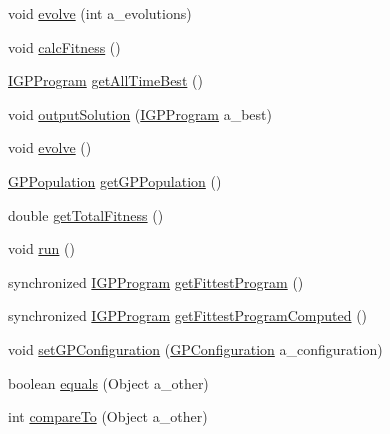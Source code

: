 \begin{DoxyCompactItemize}
\item 
void \hyperlink{classorg_1_1jgap_1_1gp_1_1impl_1_1_g_p_genotype_a43707d524245f50c92094e9e97568089}{evolve} (int a\-\_\-evolutions)
\item 
void \hyperlink{classorg_1_1jgap_1_1gp_1_1impl_1_1_g_p_genotype_aa465c7cbfb45d77644b3d195782a12c9}{calc\-Fitness} ()
\item 
\hyperlink{interfaceorg_1_1jgap_1_1gp_1_1_i_g_p_program}{I\-G\-P\-Program} \hyperlink{classorg_1_1jgap_1_1gp_1_1impl_1_1_g_p_genotype_afb8e0283f47eb7c0a0b6e09c8aeccc96}{get\-All\-Time\-Best} ()
\item 
void \hyperlink{classorg_1_1jgap_1_1gp_1_1impl_1_1_g_p_genotype_abeef3282114d1313c97045dea004afc4}{output\-Solution} (\hyperlink{interfaceorg_1_1jgap_1_1gp_1_1_i_g_p_program}{I\-G\-P\-Program} a\-\_\-best)
\item 
void \hyperlink{classorg_1_1jgap_1_1gp_1_1impl_1_1_g_p_genotype_ad495c700786596290a63e3d88a902766}{evolve} ()
\item 
\hyperlink{classorg_1_1jgap_1_1gp_1_1impl_1_1_g_p_population}{G\-P\-Population} \hyperlink{classorg_1_1jgap_1_1gp_1_1impl_1_1_g_p_genotype_a9a2316294bf28b413eb8b0e288cd150d}{get\-G\-P\-Population} ()
\item 
double \hyperlink{classorg_1_1jgap_1_1gp_1_1impl_1_1_g_p_genotype_a631996e8862da78bdb67b76687ad1873}{get\-Total\-Fitness} ()
\item 
void \hyperlink{classorg_1_1jgap_1_1gp_1_1impl_1_1_g_p_genotype_a184964a4fc96748de13cad57bee24ad0}{run} ()
\item 
synchronized \hyperlink{interfaceorg_1_1jgap_1_1gp_1_1_i_g_p_program}{I\-G\-P\-Program} \hyperlink{classorg_1_1jgap_1_1gp_1_1impl_1_1_g_p_genotype_a2cff99f216e87c7e4b25c217c5bdc5af}{get\-Fittest\-Program} ()
\item 
synchronized \hyperlink{interfaceorg_1_1jgap_1_1gp_1_1_i_g_p_program}{I\-G\-P\-Program} \hyperlink{classorg_1_1jgap_1_1gp_1_1impl_1_1_g_p_genotype_a3a1e955f3a6c035913e311570591c683}{get\-Fittest\-Program\-Computed} ()
\item 
void \hyperlink{classorg_1_1jgap_1_1gp_1_1impl_1_1_g_p_genotype_a2d46992095125ecad698dc9e1a72b513}{set\-G\-P\-Configuration} (\hyperlink{classorg_1_1jgap_1_1gp_1_1impl_1_1_g_p_configuration}{G\-P\-Configuration} a\-\_\-configuration)
\item 
boolean \hyperlink{classorg_1_1jgap_1_1gp_1_1impl_1_1_g_p_genotype_a847cbf8f0b5e3e223881ac1dfe5e36d3}{equals} (Object a\-\_\-other)
\item 
int \hyperlink{classorg_1_1jgap_1_1gp_1_1impl_1_1_g_p_genotype_aef87073769e83d93b52d8df73ebb35dc}{compare\-To} (Object a\-\_\-other)

\end{DoxyCompactItemize}
